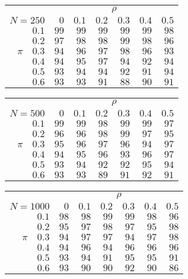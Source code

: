 \begin{tabular}{r|rrrrrr}
\hline\hline
 &\multicolumn{6}{c}{$\rho$} \\ 
 $N = 250$ & $0$ & $0.1$ & $0.2$ & $0.3$ & $0.4$ & $0.5$ \\ 
 \hline$0.1$ & $99$ & $99$ & $99$ & $99$ & $99$ & $98$\\ 
$0.2$ & $97$ & $98$ & $98$ & $99$ & $98$ & $96$\\ 
$\pi\quad$$0.3$ & $94$ & $96$ & $97$ & $98$ & $96$ & $93$\\ 
$0.4$ & $94$ & $95$ & $97$ & $94$ & $92$ & $94$\\ 
$0.5$ & $93$ & $94$ & $94$ & $92$ & $91$ & $94$\\ 
$0.6$ & $93$ & $93$ & $91$ & $88$ & $90$ & $91$\\ 
 \hline 
 \end{tabular}
 
 \vspace{2em} 
 
\begin{tabular}{r|rrrrrr}
\hline\hline
 &\multicolumn{6}{c}{$\rho$} \\ 
 $N = 500$ & $0$ & $0.1$ & $0.2$ & $0.3$ & $0.4$ & $0.5$ \\ 
 \hline$0.1$ & $99$ & $99$ & $98$ & $99$ & $99$ & $97$\\ 
$0.2$ & $96$ & $96$ & $98$ & $99$ & $97$ & $95$\\ 
$\pi\quad$$0.3$ & $95$ & $96$ & $97$ & $96$ & $94$ & $97$\\ 
$0.4$ & $94$ & $95$ & $96$ & $93$ & $96$ & $97$\\ 
$0.5$ & $93$ & $94$ & $92$ & $92$ & $95$ & $94$\\ 
$0.6$ & $93$ & $93$ & $89$ & $91$ & $92$ & $91$\\ 
 \hline 
 \end{tabular}
 
 \vspace{2em} 
 
\begin{tabular}{r|rrrrrr}
\hline\hline
 &\multicolumn{6}{c}{$\rho$} \\ 
 $N = 1000$ & $0$ & $0.1$ & $0.2$ & $0.3$ & $0.4$ & $0.5$ \\ 
 \hline$0.1$ & $98$ & $98$ & $99$ & $99$ & $98$ & $96$\\ 
$0.2$ & $95$ & $97$ & $98$ & $97$ & $95$ & $98$\\ 
$\pi\quad$$0.3$ & $94$ & $97$ & $97$ & $94$ & $97$ & $98$\\ 
$0.4$ & $94$ & $96$ & $94$ & $96$ & $96$ & $96$\\ 
$0.5$ & $93$ & $94$ & $91$ & $95$ & $95$ & $91$\\ 
$0.6$ & $93$ & $90$ & $90$ & $92$ & $90$ & $86$\\ 
 \hline 
 \end{tabular}